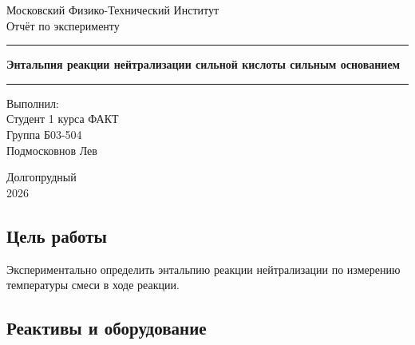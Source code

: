 \documentclass[a4paper, 12pt]{article}
\begin{document}

\begin{titlepage}
    \begin{center}

        \vspace*{5cm}

        {\Huge Московский Физико-Технический Институт}\\[2cm]

        {\LARGE Отчёт по эксперименту}\\[0.25cm]

        \noindent\rule{\textwidth}{1pt}
        \vspace*{-0.25cm}

        {\huge \textbf{Энтальпия реакции нейтрализации сильной кислоты сильным основанием}}

        \noindent\rule{\textwidth}{1pt}

        \vfill

    \end{center}

    \begin{flushright}
        \begin{minipage}{0.45\textwidth}
            {\Large
                Выполнил:\\
                Студент 1 курса ФАКТ\\
                Группа Б03-504\\
                Подмосковнов Лев
            }
        \end{minipage}
    \end{flushright}

    \vfill

    \begin{center}
        Долгопрудный\\2026
    \end{center}

\end{titlepage}
\restoregeometry

\setcounter{page}{2}

\subsection*{Цель работы}

Экспериментально определить энтальпию реакции нейтрализации по измерению температуры смеси в ходе реакции.

\subsection*{Реактивы и оборудование}
\end{document}
